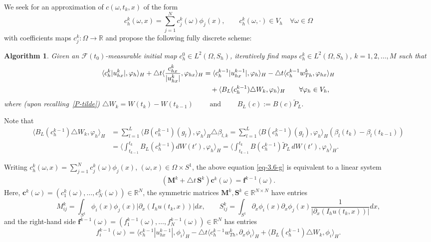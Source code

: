 \documentclass[a4paper,10pt]{article}
\newtheorem{algo}{Algorithm}[section]
\newcommand{\R}{\mathbb{R}}
\def\bbb{\boldsymbol}
\def\Bapprox{B_L}
\def\proj{\tilde{P}}
\numberwithin{equation}{section}
\begin{document}
We seek for an approximation of $c(\omega, t_{k},x)$ of the form
$$c^{k}_{h}(\omega,x)= \sum_{j=1}^{N} c_{j}^{k}(\omega) \phi_{j}(x), \qquad c^{k}_{h}(\omega,\cdot )\in V_{h} \quad \forall \omega \in \Omega$$
with coefficients maps $c_{j}^{k}: \Omega \to \R$ and propose the following fully discrete scheme:

\begin{algo}\label{fullydiscrete-scheme-g}
Given an $\mathcal{F}(t_{0})$-measurable initial map $c^{0}_{h} \in L^{2}(\Omega, S_{h})$, iteratively find maps $c^{k}_{h} \in L^{2}(\Omega, S_{h})$, $k=1,2, \ldots, M$ such that
\begin{align}\label{eq-3.6-g}
\langle c^{k}_{h} |u^{k}_{hx}|, \varphi_{h} \rangle_{H} + \triangle t \langle \frac{c^{k}_{hx}}{| u^{k}_{hx}|}, \varphi_{hx} \rangle_{H}
&= \langle c^{k-1}_{h} | u^{k-1}_{hx}|, \varphi_{h} \rangle_{H}
-\triangle t \langle c^{k-1}_{h} w_{Th}^{k}, \varphi_{hx} \rangle_{H} \notag\\
& \quad + \langle \Bapprox(c^{k-1}_{h})\triangle W_{k}, \varphi_{h}\rangle_{H}
\qquad \forall \varphi_{h} \in V_{h},
\end{align}
where (upon recalling~\eqref{P-tilde})
$\triangle W_{k}= W(t_{k})-W(t_{k-1}) \qquad \text{ and } \qquad \Bapprox(c):= B(c)\proj_{L}.$
\end{algo}

Note that
\begin{align*}
\langle \Bapprox(c^{k-1}_{h})\triangle W_{k}, \varphi_{h}\rangle_{H}
&= \sum_{l=1}^{L} \langle B(c^{k-1}_{h})(g_{l}), \varphi_{h} \rangle_{H} \triangle \beta_{l,k}
=\sum_{l=1}^{L} \langle B(c^{k-1}_{h})(g_{l}), \varphi_{h} \rangle_{H} (\beta_{l}(t_{k})-\beta_{l}(t_{k-1}))\\
&= \langle \int_{t_{k-1}}^{t_{k}} \Bapprox(c^{k-1}_{h}) dW(t'), \varphi_{h} \rangle_{H}
= \langle \int_{t_{k-1}}^{t_{k}} B(c^{k-1}_{h}) \proj_{L} \,dW(t'), \varphi_{h} \rangle_{H}.
\end{align*}

Writing $c_h^k(\omega,x) = \sum_{j=1}^{N} c^{k}_{j}(\omega) \phi_j(x)$, $(\omega,x) \in \Omega \times S^1$, the above equation \eqref{eq-3.6-g} is equivalent to a linear system
\begin{align}
(\bbb{M}^{k} + \triangle t\, \bbb{S}^{k})\bbb{c}^{k}(\omega)= \bbb{f}^{k-1}(\omega). \label{eq:linsys}
\end{align}
Here, $\bbb{c}^{k}(\omega) = (c^{k}_{1}(\omega), \ldots, c^{k}_{N}(\omega)) \in \R^N$, the symmetric matrices $\bbb{M}^{k}, \bbb{S}^{k} \in \R^{N \times N}$ have entries
$$ M_{ij}^{k} = \int_{S^{1}} \phi_{i}(x) \phi_{j}(x) |\partial_{x}(I_{h} u (t_{k}, x))| dx, \qquad
S_{ij}^{k} = \int_{S^{1}} \partial_{x}\phi_{i}(x) \partial_{x}\phi_{j}(x) \frac{1}{| \partial_{x}(I_{h} u (t_{k}, x))|} dx, $$
and the right-hand side $\bbb{f}^{k-1}(\omega) = (f_{1}^{k-1}(\omega), \ldots, f_{N}^{k-1}(\omega)) \in \R^N$ has entries
$$ f_{i}^{k-1}(\omega) = \langle c^{k-1}_{h} | u^{k-1}_{hx}|, \phi_{i} \rangle_{H}
-\triangle t \langle c^{k-1}_{h} w_{Th}^{k}, \partial_{x} \phi_{i} \rangle_{H}
+ \langle \Bapprox(c^{k-1}_{h}) \triangle W_{k}, \phi_{i} \rangle_{H}.$$
\end{document}
